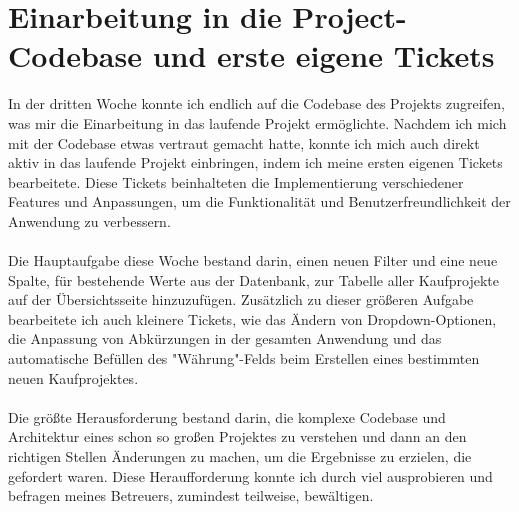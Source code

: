 \section{Einarbeitung in die Project-Codebase und erste eigene Tickets}
In der dritten Woche konnte ich endlich auf die Codebase des Projekts zugreifen, was mir die Einarbeitung in das laufende Projekt ermöglichte. Nachdem ich mich mit der Codebase etwas vertraut gemacht hatte, konnte ich mich auch direkt aktiv in das laufende Projekt einbringen, indem ich meine ersten eigenen Tickets bearbeitete. Diese Tickets beinhalteten die Implementierung verschiedener Features und Anpassungen, um die Funktionalität und Benutzerfreundlichkeit der Anwendung zu verbessern. \\\\
Die Hauptaufgabe diese Woche bestand darin, einen neuen Filter und eine neue Spalte, für bestehende Werte aus der Datenbank, zur Tabelle aller Kaufprojekte auf der Übersichtsseite hinzuzufügen. Zusätzlich zu dieser größeren Aufgabe bearbeitete ich auch kleinere Tickets, wie das Ändern von Dropdown-Optionen, die Anpassung von Abkürzungen in der gesamten Anwendung und das automatische Befüllen des "Währung"-Felds beim Erstellen eines bestimmten neuen Kaufprojektes. \\\\
Die größte Herausforderung bestand darin, die komplexe Codebase und Architektur eines schon so großen Projektes zu verstehen und dann an den richtigen Stellen Änderungen zu machen, um die Ergebnisse zu erzielen, die gefordert waren. Diese Heraufforderung konnte ich durch viel ausprobieren und befragen meines Betreuers, zumindest teilweise, bewältigen. \\\\

